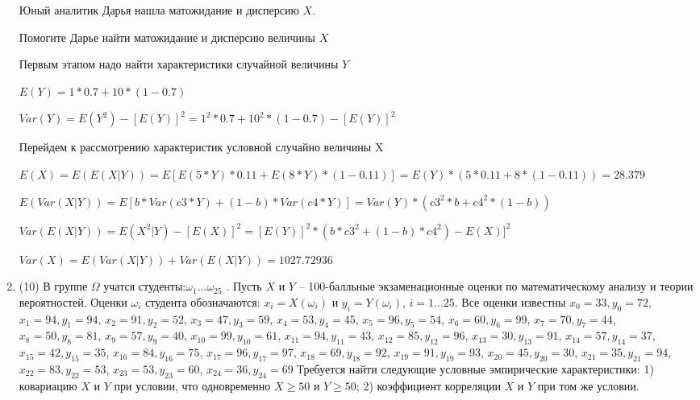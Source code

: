 \documentclass[a4paper,12pt]{article}
\begin{document}
\begin{enumerate}
	Юный аналитик Дарья нашла матожидание и дисперсию $X$.

	Помогите Дарье найти матожидание и дисперсию величины $X$
	


	

	Первым этапом надо найти характеристики случайной величины $Y$

	$E(Y) = 1 * 0.7 + 10 * (1 - 0.7)$

	$Var(Y) = E(Y^2) - [E(Y)]^2 = 1^2 * 0.7 + 10^2 * (1 - 0.7) - [E(Y)]^2$


	Перейдем к рассмотрению характеристик условной случайно величины X

	$E(X) = E(E(X|Y)) = E[E(5 * Y) * 0.11 + E(8 * Y) * (1 - 0.11)] = E(Y) * (5 * 0.11 + 8 * (1 - 0.11)) = 28.379$

	$E(Var(X|Y)) = E[b * Var(c3 * Y) + (1 - b) * Var(c4 * Y)] = Var(Y) * (c3^2 * b + c4^2 * (1- b)) $

	$Var(E(X|Y)) = E(X^2|Y) - [E(X)]^2 = [E(Y)]^2 * (b * c3^2 + (1-b)*c4^2) - E(X)]^2$

	$Var(X) = E(Var(X|Y)) + Var(E(X|Y)) = 1027.72936$
	

\item


(10) В группе $\Omega$ учатся студенты:$\omega _{1}...\omega _{25}$ . Пусть $X$ и $Y$ – 100-балльные экзаменационные оценки по
математическому анализу и теории вероятностей. Оценки $\omega _{i}$ студента обозначаются: $x _{i} = X(\omega _{i})$ и $y _{i} = Y(\omega _{i})$, $i = 1...25$. Все оценки известны
$x _{0} = 33, y _{0} = 72$, $x _{1} = 94, y _{1} = 94$, $x _{2} = 91, y _{2} = 52$, $x _{3} = 47, y _{3} = 59$, $x _{4} = 53, y _{4} = 45$, $x _{5} = 96, y _{5} = 54$, $x _{6} = 60, y _{6} = 99$, $x _{7} = 70, y _{7} = 44$, $x _{8} = 50, y _{8} = 81$, $x _{9} = 57, y _{9} = 40$, $x _{10} = 99, y _{10} = 61$, $x _{11} = 94, y _{11} = 43$, $x _{12} = 85, y _{12} = 96$, $x _{13} = 30, y _{13} = 91$, $x _{14} = 57, y _{14} = 37$, $x _{15} = 42, y _{15} = 35$, $x _{16} = 84, y _{16} = 75$, $x _{17} = 96, y _{17} = 97$, $x _{18} = 69, y _{18} = 92$, $x _{19} = 91, y _{19} = 93$, $x _{20} = 45, y _{20} = 30$, $x _{21} = 35, y _{21} = 94$, $x _{22} = 83, y _{22} = 53$, $x _{23} = 53, y _{23} = 60$, $x _{24} = 36, y _{24} = 69$
Требуется
найти следующие условные эмпирические характеристики: 1) ковариацию $X$ и $Y$ при условии, что одновременно $X \geqslant 50$
 и $Y \geqslant 50$; 2) коэффициент корреляции $X$ и $Y$ при том же условии.





\end{enumerate}
\end{document}
